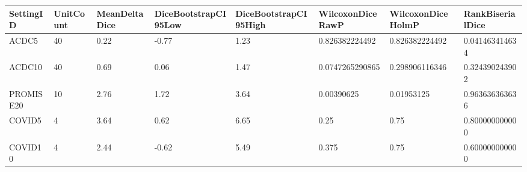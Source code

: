 \begin{tabular}{llllllll}
\toprule
SettingID & UnitCount & MeanDeltaDice & DiceBootstrapCI95Low & DiceBootstrapCI95High & WilcoxonDiceRawP & WilcoxonDiceHolmP & RankBiserialDice \\
\midrule
ACDC5 & 40 & 0.22 & -0.77 & 1.23 & 0.826382224492 & 0.826382224492 & 0.041463414634 \\
ACDC10 & 40 & 0.69 & 0.06 & 1.47 & 0.0747265290865 & 0.298906116346 & 0.324390243902 \\
PROMISE20 & 10 & 2.76 & 1.72 & 3.64 & 0.00390625 & 0.01953125 & 0.963636363636 \\
COVID5 & 4 & 3.64 & 0.62 & 6.65 & 0.25 & 0.75 & 0.800000000000 \\
COVID10 & 4 & 2.44 & -0.62 & 5.49 & 0.375 & 0.75 & 0.600000000000 \\
\bottomrule
\end{tabular}
